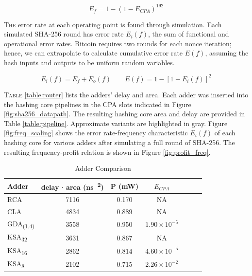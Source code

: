 \documentclass[portrait,a0,final]{a0poster}
\begin{document}
\begin{multicols}{3}
\begin{tcolorbox}[title=Approximate Mining]
\begin{equation}
\label{eq:error_func}
E_f = 1 - (1 - E_{CPA})^{192}
\end{equation}

\lettrine{T}{he} error rate at each operating point is found through simulation. Each simulated SHA-256 round has error rate $E_i(f)$, the sum of functional and operational error rates. Bitcoin requires two rounds for each nonce iteration; hence, we can extrapolate to calculate cumulative error rate $E(f)$, assuming the hash inputs and outputs to be uniform random variables.

\begin{equation}
E_i(f) = E_f + E_o(f) \qquad E(f) = 1 - [1 - E_i(f)]^2
\end{equation}
\end{tcolorbox}

\begin{tcolorbox}[title=Results]
\lettrine{T}{able} \ref{table:router} lists the adders' delay and area. Each adder was inserted into the hashing core pipelines in the CPA slots indicated in Figure \ref{fig:sha256_datapath}. The resulting hashing core area and delay are provided in Table \ref{table:pipeline}. Approximate variants are highlighted in gray. Figure \ref{fig:freq_scaling} shows the error rate-frequency characteristic $E_i(f)$ of each hashing core for various adders after simulating a full round of SHA-256. The resulting frequency-profit relation is shown in Figure \ref{fig:profit_freq}.
\end{tcolorbox}

\begin{table}[H]
\centering
\caption{Adder Comparison}
\label{table:adders}
\begin{tabular}{l*{5}{c}r}
Adder & delay $\cdot$ area (\si{\nano\second \cdot {\micro\meter}^2}) & P (\si{\milli\watt}) & $E_{CPA}$ \\
\hline
RCA & 7116 & 0.170 & NA \\
CLA & 4834 & 0.889 & NA \\
\rowcolor{gray}
GDA\textsubscript{(1,4)} & 3558 & 0.950 & $1.90 \times 10^{-5}$ \\
KSA\textsubscript{32} & 3631 & 0.867 & NA \\
\rowcolor{gray}
KSA\textsubscript{16} & 2862 & 0.814 & $4.60 \times 10^{-5}$ \\
\rowcolor{gray}
KSA\textsubscript{8} & 2102 & 0.715 & $2.26 \times 10^{-2}$ \\
\end{tabular}


\end{table}
\end{multicols}
\end{document}
